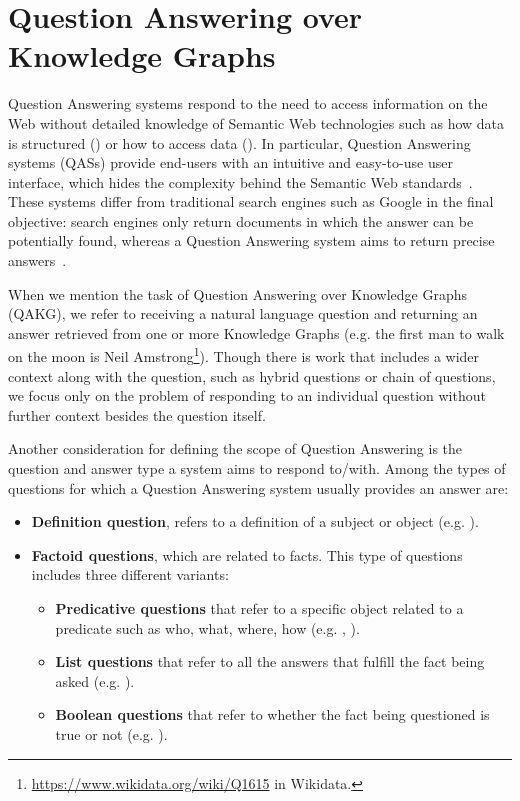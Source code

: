 \section{Question Answering over Knowledge Graphs}
\label{cap2:theoFrame/qakg}
Question Answering systems respond to the need to access information on the Web without 
detailed knowledge of Semantic Web technologies such as how data is structured (\RDF{}) or how to 
access data (\SPARQL{}). In particular, Question Answering systems (QASs) provide end-users with an 
intuitive and easy-to-use user interface, which hides the complexity behind the Semantic Web 
standards~\cite{qa:intro-UngerFC14}. These systems differ from traditional search engines such 
as Google in the final objective: search engines only return documents in which the answer can be 
potentially found, whereas a Question Answering system aims to return precise answers~\cite{qa:LopezUSM11}.

When we mention the task of Question Answering over Knowledge Graphs (QAKG), we refer to 
receiving a natural language question and returning an answer retrieved from one or more 
Knowledge Graphs (e.g. the first man to walk on the moon is Neil 
Amstrong\footnote{\url{https://www.wikidata.org/wiki/Q1615} in Wikidata.}). Though there is work 
that includes a wider context along with the question, such as hybrid questions or chain of 
questions, we focus only on the problem of responding to an individual question without further 
context besides the question itself.

Another consideration for defining the scope of Question Answering is the question and answer 
type a system aims to respond to/with. Among the types of questions for which a Question 
Answering system usually provides an answer are:

\begin{itemize}
    \item \textbf{Definition question}, refers to a definition of a subject or object (e.g. 
    ).
    \item \textbf{Factoid questions}, which are related to facts. This type of questions 
    includes three different variants:
    \begin{itemize}
        \item \textbf{Predicative questions} that refer to a specific object related to a predicate 
        such as who, what, where, how (e.g. , 
        ).
        \item \textbf{List questions} that refer to all the answers that fulfill the fact being 
        asked (e.g. ).
        \item \textbf{Boolean questions} that refer to whether the fact being questioned is true 
        or not (e.g. ).
    \end{itemize}
\end{itemize}

